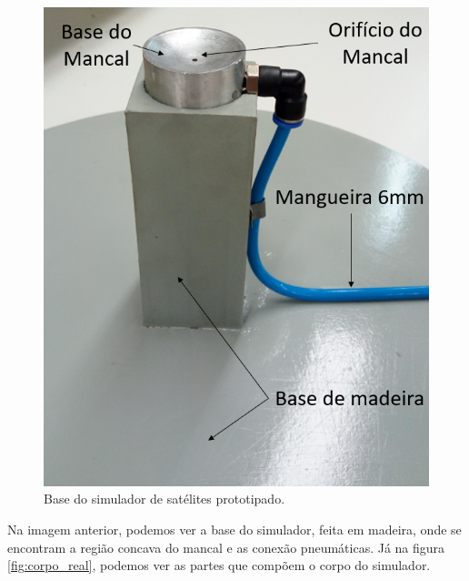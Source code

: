 \begin{figure}[H]
  \caption{Base do simulador de satélites prototipado.}
  \begin{center}
      \includegraphics[scale=.5]{metodologia/img/base_real}
  \end{center}
  \label{fig:base_real}
\end{figure}

Na imagem anterior, podemos ver a base do simulador, feita em madeira, onde se encontram a região concava do mancal e as conexão 
pneumáticas. Já na figura \ref{fig:corpo_real}, podemos ver as partes que compõem o corpo do simulador.

